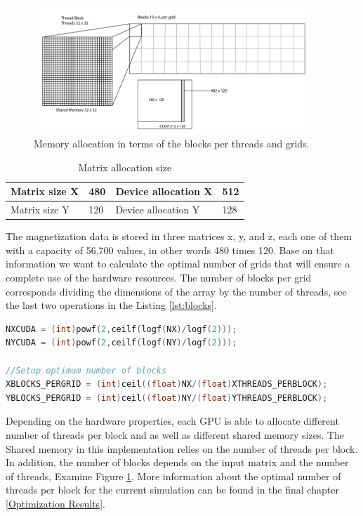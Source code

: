 \begin{figure}[htbp]
	\centering
		\includegraphics[width=0.93\textwidth]{Figures/block.png}
		\smallskip
	\caption[Grid layout]{Memory allocation in terms of the blocks per threads and grids.}
	\label{fig:block}
\end{figure}


\begin{table}[h]
\centering
\begin{tabular}{| l | l | l | l | }
\hline
Matrix size X & 480 & Device allocation X & 512\\
\hline
Matrix size Y & 120 & Device allocation Y & 128 \\
\hline
\end{tabular}
\caption{Matrix allocation size}
\label{tab:cuda}
\end{table}

The magnetization data is stored in three matrices x, y, and z, each one of them with a capacity of 56,700 values, in other words 480 times 120. Base on that information we want to calculate the optimal number of grids that will ensure a complete use of the hardware resources. The number of blocks per grid corresponds dividing the dimensions of the array by the number of threads, see the last two operations in the Listing \ref{lst:blocks}.

\begin{lstlisting}[language=C++, label={lst:blocks}, caption={Device capacity calculation and number of block per grid}]	
NXCUDA = (int)powf(2,ceilf(logf(NX)/logf(2)));
NYCUDA = (int)powf(2,ceilf(logf(NY)/logf(2)));

//Setup optimum number of blocks
XBLOCKS_PERGRID = (int)ceil((float)NX/(float)XTHREADS_PERBLOCK); 
YBLOCKS_PERGRID = (int)ceil((float)NY/(float)YTHREADS_PERBLOCK);
\end{lstlisting}

Depending on the hardware properties, each GPU is able to allocate different number of threads per block and as well as different shared memory sizes. The Shared memory in this implementation relies on the number of threads per block. In addition, the number of blocks depends on the input matrix and the number of threads, Examine Figure \ref{fig:block}. More information about the optimal number of threads per block for the current simulation can be found in the final chapter \ref{Optimization Results}. 

